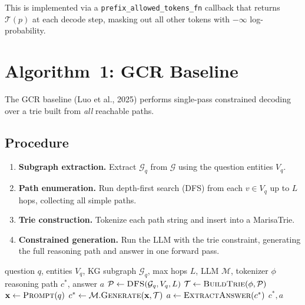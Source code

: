 \documentclass[11pt,a4paper]{article}
\newcommand{\G}{\mathcal{G}}
\newcommand{\T}{\mathcal{T}}
\begin{document}
This is implemented via a \texttt{prefix\_allowed\_tokens\_fn} callback
that returns $\T(p)$ at each decode step, masking out all other tokens
with $-\infty$ log-probability.

\section{Algorithm~1: GCR Baseline}

The GCR baseline (Luo et al., 2025) performs single-pass constrained
decoding over a trie built from \emph{all} reachable paths.

\subsection{Procedure}

\begin{enumerate}
  \item \textbf{Subgraph extraction.}  Extract $\G_q$ from $\G$ using
    the question entities $V_q$.
  \item \textbf{Path enumeration.}  Run depth-first search (DFS) from
    each $v \in V_q$ up to $L$ hops, collecting all simple paths.
  \item \textbf{Trie construction.}  Tokenize each path string and
    insert into a MarisaTrie.
  \item \textbf{Constrained generation.}  Run the LLM with the trie
    constraint, generating the full reasoning path and answer in one
    forward pass.
\end{enumerate}

\begin{algorithm}[H]
\caption{GCR Baseline: Single-Pass Constrained Decoding}
\label{alg:baseline}
\begin{algorithmic}[1]
\Require question $q$, entities $V_q$, KG subgraph $\G_q$, max hops
  $L$, LLM $\mathcal{M}$, tokenizer $\phi$
\Ensure reasoning path $c^*$, answer $a$
\State $\mathcal{P} \gets \textsc{DFS}(\G_q, V_q, L)$
\State $\T \gets \textsc{BuildTrie}(\phi, \mathcal{P})$
\State $\mathbf{x} \gets \textsc{Prompt}(q)$
\State $c^* \gets \mathcal{M}.\textsc{Generate}(\mathbf{x}, \T)$
\State $a \gets \textsc{ExtractAnswer}(c^*)$
\State \Return $c^*, a$
\end{algorithmic}
\end{algorithm}
\end{document}
